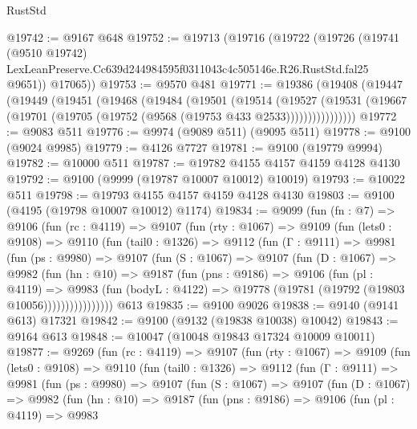 \begin{lexlean}{RustStd}
\begin{coremodule}
@19742 := @9167 @648
@19752 := @19713
    (@19716
      (@19722
        (@19726
          (@19741
            (@9510 @19742)
            LexLeanPreserve.Cc639d244984595f0311043c4c505146e.R26.RustStd.fal25
            @9651))
        @17065))
@19753 := @9570 @481
@19771 := @19386
    (@19408
      (@19447
        (@19449
          (@19451
            (@19468
              (@19484
                (@19501
                  (@19514
                    (@19527
                      (@19531
                        (@19667 (@19701 (@19705 (@19752 (@9568 (@19753 @433 @2533))))))))))))))))
@19772 := @9083 @511
@19776 := @9974 (@9089 @511) (@9095 @511)
@19778 := @9100 (@9024 @9985)
@19779 := @4126 @7727
@19781 := @9100 (@19779 @9994)
@19782 := @10000 @511
@19787 := @19782 @4155 @4157 @4159 @4128 @4130
@19792 := @9100 (@9999 (@19787 @10007 @10012) @10019)
@19793 := @10022 @511
@19798 := @19793 @4155 @4157 @4159 @4128 @4130
@19803 := @9100 (@4195 (@19798 @10007 @10012) @1174)
@19834 := @9099
    (fun (fn : @7) =>
    @9106
      (fun (rc : @4119) =>
      @9107
        (fun (rty : @1067) =>
        @9109
          (fun (lets0 : @9108) =>
          @9110
            (fun (tail0 : @1326) =>
            @9112
              (fun (Γ : @9111) =>
              @9981
                (fun (ps : @9980) =>
                @9107
                  (fun (S : @1067) =>
                  @9107
                    (fun (D : @1067) =>
                    @9982
                      (fun (hn : @10) =>
                      @9187
                        (fun (pns : @9186) =>
                        @9106
                          (fun (pl : @4119) =>
                          @9983
                            (fun (bodyL : @4122) =>
                            @19778 (@19781 (@19792 (@19803 @10056))))))))))))))))
    @613
@19835 := @9100 @9026
@19838 := @9140 (@9141 @613) @17321
@19842 := @9100 (@9132 (@19838 @10038) @10042)
@19843 := @9164 @613
@19848 := @10047 (@10048 @19843 @17324 @10009 @10011)
@19877 := @9269
    (fun (rc : @4119) =>
    @9107
      (fun (rty : @1067) =>
      @9109
        (fun (lets0 : @9108) =>
        @9110
          (fun (tail0 : @1326) =>
          @9112
            (fun (Γ : @9111) =>
            @9981
              (fun (ps : @9980) =>
              @9107
                (fun (S : @1067) =>
                @9107
                  (fun (D : @1067) =>
                  @9982
                    (fun (hn : @10) =>
                    @9187
                      (fun (pns : @9186) =>
                      @9106
                        (fun (pl : @4119) =>
                        @9983

\end{coremodule}
\end{lexlean}
